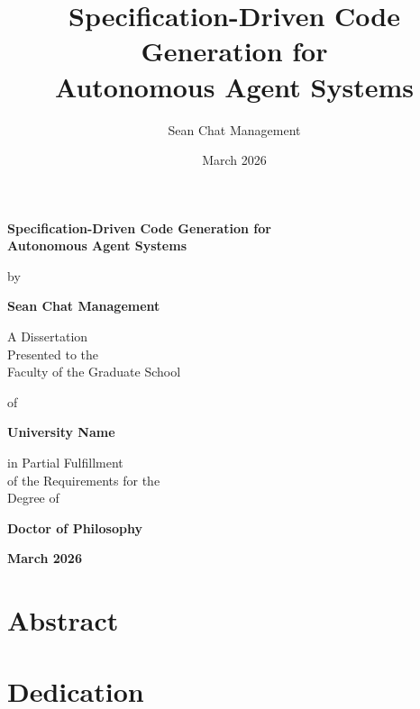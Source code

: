 \documentclass[12pt,letterpaper,oneside]{report}
\title{\textbf{Specification-Driven Code Generation for\\Autonomous Agent Systems}}
\author{Sean Chat Management}
\date{March 2026}
\theoremstyle{definition}
\theoremstyle{remark}
\begin{document}
\begin{titlepage}
    \centering
    \vspace*{2cm}

    {\Huge \textbf{Specification-Driven Code Generation for\\Autonomous Agent Systems}\par}

    \vspace{1.5cm}

    {\Large by\par}

    \vspace{0.5cm}

    {\Large \textbf{Sean Chat Management}\par}

    \vspace{2cm}

    A Dissertation\\
    Presented to the\\
    Faculty of the Graduate School

    \vspace{1cm}

    of

    \vspace{1cm}

    \textbf{University Name}

    \vspace{2cm}

    in Partial Fulfillment\\
    of the Requirements for the\\
    Degree of

    \vspace{0.5cm}

    \textbf{Doctor of Philosophy}

    \vspace*{2cm}

    \textbf{March 2026}
\end{titlepage}

\chapter*{Abstract}



\chapter*{Dedication}
\end{document}

